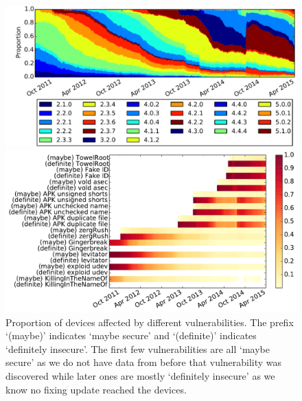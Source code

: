 \documentclass{llncs}
\newcommand{\da}{Device Analyzer}
\begin{document}
\begin{figure}[!h]
 \centering
 \includegraphics[width=\textwidth]{figures/da_norm_os}
 \caption{Android versions in \da\ data over time. The anomaly beginning in August 2014 is explained in \S\ref{sec:da_changes}.}
 \label{fig:norm_os}
 \includegraphics[width=\textwidth]{figures/nvulnerabilities_heat.pdf}
 \caption{Proportion of devices affected by different vulnerabilities. The prefix `(maybe)' indicates `maybe secure' and `(definite)' indicates `definitely insecure'. The first few vulnerabilities are all `maybe secure' as we do not have data from before that vulnerability was discovered while later ones are mostly `definitely insecure' as we know no fixing update reached the devices.
 }
 \label{fig:nvulnerabilities_heat}
\end{figure}
\end{document}
